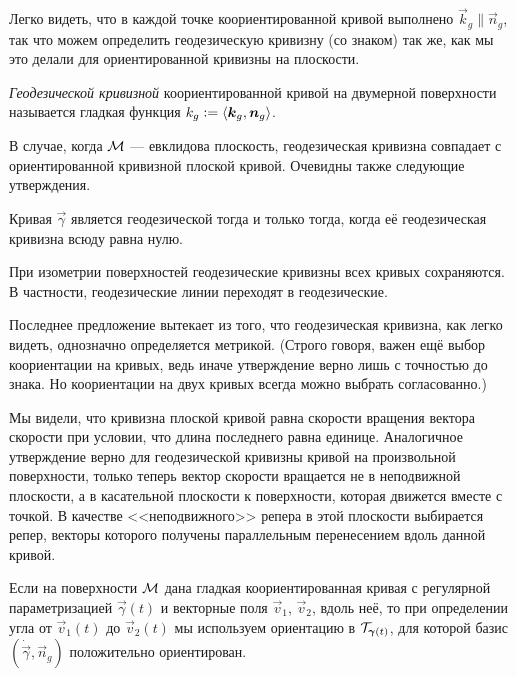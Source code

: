 Легко видеть, что в каждой точке коориентированной кривой выполнено $\vec{k}_g \parallel \vec{n}_g$, так что можем определить геодезическую кривизну (со знаком) так же, как мы это делали для ориентированной кривизны на плоскости.

\begin{definition}
	\textit{Геодезической кривизной} коориентированной кривой на двумерной поверхности называется гладкая функция $k_g\vcentcolon = \langle\vec{k}_g, \vec{n}_g\rangle$.
\end{definition}

В случае, когда $\M$ --- евклидова плоскость, геодезическая кривизна совпадает с ориентированной кривизной плоской кривой. Очевидны также следующие утверждения.

\begin{proposition}
	Кривая $\vec{\gamma}$ является геодезической тогда и только тогда, когда её геодезическая кривизна всюду равна нулю.
\end{proposition}

\begin{proposition}
	При изометрии поверхностей геодезические кривизны всех кривых сохраняются. В частности, геодезические линии переходят в геодезические.
\end{proposition}

Последнее предложение вытекает из того, что геодезическая кривизна, как легко видеть, однозначно определяется метрикой. (Строго говоря, важен ещё выбор коориентации на кривых, ведь иначе утверждение верно лишь с точностью до знака. Но коориентации на двух кривых всегда можно выбрать согласованно.)

Мы видели, что кривизна плоской кривой равна скорости вращения вектора скорости при условии, что длина последнего равна единице. Аналогичное утверждение верно для геодезической кривизны кривой на произвольной поверхности, только теперь вектор скорости вращается не в неподвижной плоскости, а в касательной плоскости к поверхности, которая движется вместе с точкой. В качестве <<неподвижного>> репера в этой плоскости выбирается репер, векторы которого получены параллельным перенесением вдоль данной кривой.

Если на поверхности $\M$ дана гладкая коориентированная кривая с регулярной параметризацией $\vec{\gamma}(t)$ и векторные поля $\vec{v}_1$, $\vec{v}_2$, вдоль неё, то при определении угла от $\vec{v}_1(t)$ до $\vec{v}_2(t)$ мы используем ориентацию в $\T_{\vec{\gamma}(t)}$, для которой базис $(\dot{\vec{\gamma}}, \vec{n}_g)$ положительно ориентирован\footnotemark{}.

